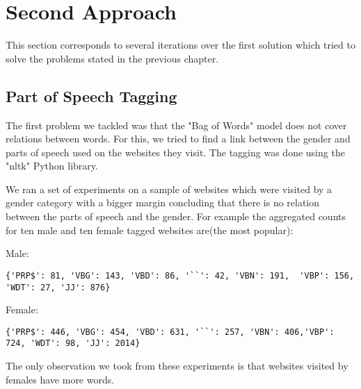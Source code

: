 \section{Second Approach}

This section corresponds to several iterations over the first solution which tried to solve the problems stated in the previous chapter.

\subsection{Part of Speech Tagging}

The first problem we tackled was that the "Bag of Words" model does not cover relations between words. For this, we tried to find a link between the gender and parts of speech used on the websites they visit. The tagging was done using the "nltk" Python library.

We ran a set of experiments on a sample of websites which were visited by a gender category with a bigger margin concluding that there is no relation between the parts of speech and the gender. For example the aggregated counts for ten male and ten female tagged websites are(the most popular):

Male:
\begin{lstlisting} 
{'PRP$': 81, 'VBG': 143, 'VBD': 86, '``': 42, 'VBN': 191,  'VBP': 156, 'WDT': 27, 'JJ': 876}
\end{lstlisting}

Female:
\begin{lstlisting}
{'PRP$': 446, 'VBG': 454, 'VBD': 631, '``': 257, 'VBN': 406,'VBP': 724, 'WDT': 98, 'JJ': 2014}
 \end{lstlisting}

The only observation we took from these experiments is that websites visited by females have more words.